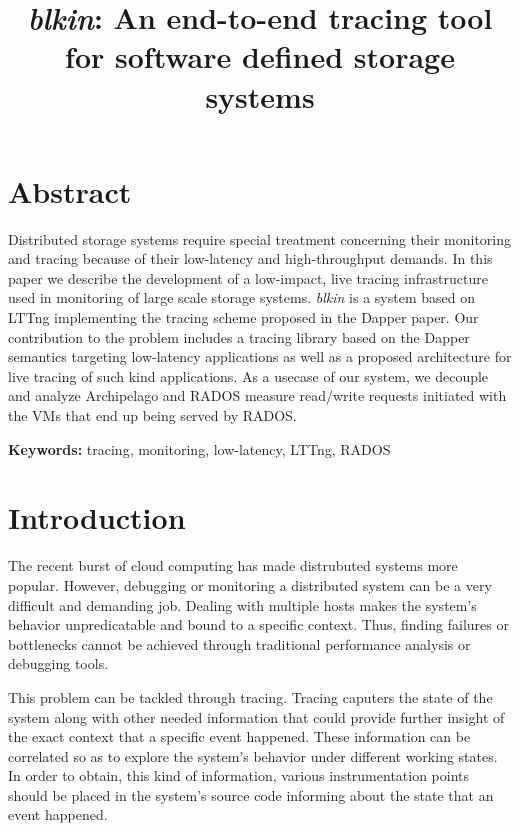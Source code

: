 \documentclass[a4paper,12pt]{article}
\begin{document}
\title{\emph{blkin}: An end-to-end tracing tool for software defined storage 
systems}
\date{}
\maketitle

\section*{Abstract}
Distributed storage systems require special treatment concerning their 
monitoring and tracing because of their low-latency and high-throughput demands.
In this paper we describe the development of a low-impact, live tracing 
infrastructure used in monitoring of large scale storage systems. \emph{blkin}
is a system based on LTTng\cite{lttng} implementing the tracing scheme proposed
in the Dapper paper\cite{dapper}. Our contribution to the problem includes a 
tracing library based on the Dapper semantics targeting low-latency applications
as well as a proposed architecture for live tracing of such kind applications.
As a usecase of our system, we decouple and analyze Archipelago\cite{archip} and
RADOS\cite{rados} measure read/write requests initiated with the VMs that end up
being served by RADOS.


\textbf{Keywords: } tracing, monitoring, low-latency, LTTng, RADOS

\section{Introduction}

The recent burst of cloud computing has made distrubuted systems more popular.
However, debugging or monitoring a distributed system can be a very difficult 
and demanding job. Dealing with multiple hosts makes the system's behavior 
unpredicatable and bound to a specific context. Thus, finding failures or 
bottlenecks cannot be achieved through traditional performance analysis or 
debugging tools. 

This problem can be tackled through tracing. Tracing caputers the state of the
system along with other needed information that could provide further insight of
the exact context that a specific event happened. These information can be 
correlated so as to explore the system's behavior under different working 
states. In order to obtain, this kind of information, various instrumentation
points should be placed in the system's source code informing about the state
that an event happened.
\end{document}
